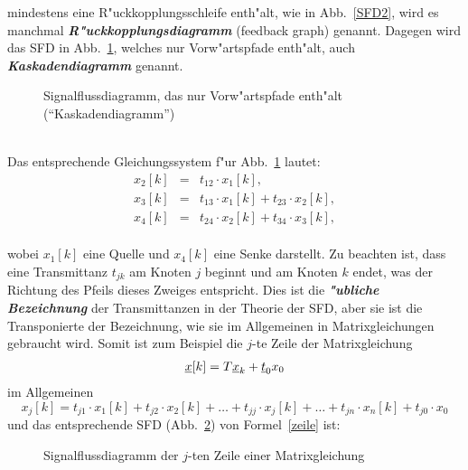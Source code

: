 mindestens eine R"uckkopplungsschleife 
enth"alt, wie in Abb.~\ref{SFD2}, wird es manchmal
{\it\textbf{R"uckkopplungsdiagramm}}  (feedback
graph) genannt. Dagegen wird das SFD in Abb.~\ref{SFD3}, welches nur
Vorw"artspfade enth"alt, auch {\it\textbf{Kaskadendiagramm}}
genannt.
\begin{figure}[htb!]
\begin{center}
  \caption{Signalflussdiagramm, das nur Vorw"artspfade enth"alt
(``Kaskadendiagramm'')}\label{SFD3}
\end{center}
\vspace*{-7mm}
\end{figure}\\
\nit Das entsprechende Gleichungssystem f"ur Abb.~\ref{SFD3} lautet:
\begin{eqnarray}
 x_2[k] & = & t_{12}\cdot x_1[k], \nonumber\\
 x_3[k] & = & t_{13}\cdot x_1[k] + t_{23}\cdot x_2[k], \\
 x_4[k] & = & t_{24}\cdot x_2[k] + t_{34}\cdot x_3[k], \nonumber  
\end{eqnarray}\\
\nit wobei $x_1[k]$ eine Quelle und $x_4[k]$ eine Senke darstellt. Zu
beachten ist, dass eine Transmittanz $t_{jk}$ am Knoten $j$ beginnt
und am Knoten $k$ endet, was der Richtung des Pfeils dieses Zweiges
entspricht. Dies ist die  {\it\textbf{"ubliche Bezeichnung}} der Transmittanzen in
der Theorie der SFD, aber sie ist die Transponierte der Bezeichnung,
wie sie im Allgemeinen in Matrixgleichungen gebraucht wird. Somit ist
zum Beispiel die $j$-te Zeile der Matrixgleichung
\begin{eqnarray*}
 \underline{x}[k] =  \boldmath{T} \underline{x}_k + \underline{t}_0 x_0
\end{eqnarray*}
 im Allgemeinen 
\begin{equation}
  x_j[k] = t_{j1} \cdot x_1[k] + t_{j2} \cdot x_2[k] + \ldots + t_{jj} \cdot x_j[k] + \ldots + t_{jn} \cdot x_n[k] + t_{j0} \cdot x_0 \label{zeile}
\end{equation}
und das entsprechende SFD (Abb.~\ref{SFD4}) von Formel~\ref{zeile} ist:\\
\begin{figure}[htb!]
\begin{center}
  \caption{Signalflussdiagramm der $j$-ten Zeile einer Matrixgleichung}\label{SFD4}
\end{center}
\vspace*{-7mm}
\end{figure}\\
